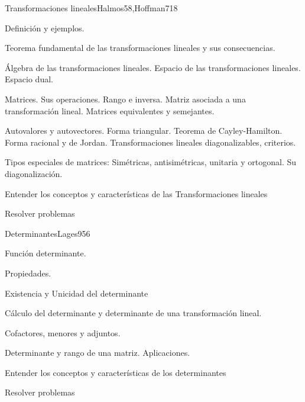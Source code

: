 \begin{sumilla}
\begin{unit}{Transformaciones lineales}{Halmos58,Hoffman71}{8}
   \begin{topicos}
         \item  Definici\'on y ejemplos.
	 \item  Teorema fundamental de las transformaciones lineales y sus consecuencias.
         \item  \'Algebra de las transformaciones lineales. Espacio de las transformaciones lineales. Espacio dual.
	 \item  Matrices. Sus operaciones. Rango e inversa. Matriz asociada a una transformaci\'on lineal. Matrices equivalentes y semejantes.
         \item  Autovalores y autovectores. Forma triangular. Teorema de Cayley-Hamilton. Forma racional y de  Jordan. Transformaciones lineales diagonalizables, criterios.
	 \item  Tipos especiales de matrices: Sim\'etricas, antisim\'etricas, unitaria y ortogonal. Su diagonalizaci\'on.
   \end{topicos}

   \begin{objetivos}
         \item  Entender los conceptos y caracter\'isticas de las Transformaciones lineales
         \item  Resolver problemas
   \end{objetivos}
\end{unit}

\begin{unit}{Determinantes}{Lages95}{6}
   \begin{topicos}
         \item  Funci\'on determinante.
	 \item  Propiedades.
         \item  Existencia y Unicidad del determinante
	 \item  C\'alculo del determinante y determinante de una transformaci\'on lineal.
         \item  Cofactores, menores y adjuntos.
	\item Determinante y rango de una matriz. Aplicaciones.
   \end{topicos}

   \begin{objetivos}
         \item  Entender los conceptos y caracter\'isticas de los determinantes
         \item  Resolver problemas
   \end{objetivos}
\end{unit}


\end{sumilla}
